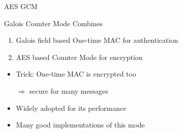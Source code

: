 \documentclass[aspectratio=169, lualatex, handout, 10pt,dvipsnames,svgnames]{beamer} %
\def\enrouge#1{\textcolor{rouge}{#1}}
\begin{document}
\begin{frame}{AES GCM}

  \begin{block}{Galois Counter Mode}
    Combines
    \begin{enumerate}
    \item \enrouge{Galois field} based One-time MAC for authentication
    \item \enrouge{AES} based Counter Mode for encryption
    \end{enumerate}
  \end{block}
  \bigskip{}

  \begin{itemize}
  \item \enrouge{Trick}: One-time MAC is encrypted too

    $\Rightarrow$ secure for many messages
    
  \item Widely adopted for its performance
    
  \item Many good implementations of this mode
  \end{itemize}
  
\end{frame}
\end{document}
